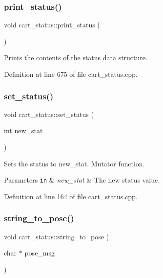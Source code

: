 \subsubsection{\texorpdfstring{print\+\_\+status()}{print\_status()}}
{\footnotesize\ttfamily void cart\+\_\+status\+::print\+\_\+status (\begin{DoxyParamCaption}{ }\end{DoxyParamCaption})}

Prints the contents of the status data structure. 

Definition at line 675 of file cart\+\_\+status.\+cpp.

\mbox{\label{classcart__status_a5db1241aff0bd874c8d108666ec8b323}} 
\subsubsection{\texorpdfstring{set\+\_\+status()}{set\_status()}}
{\footnotesize\ttfamily void cart\+\_\+status\+::set\+\_\+status (\begin{DoxyParamCaption}\item[{int}]{new\+\_\+stat }\end{DoxyParamCaption})}

Sets the status to new\+\_\+stat. Mutator function. 
\begin{DoxyParams}[1]{Parameters}
\mbox{\tt in}  & {\em new\+\_\+stat} & The new status value. \\
\hline
\end{DoxyParams}


Definition at line 164 of file cart\+\_\+status.\+cpp.

\mbox{\label{classcart__status_acacf14bfb0b1be8f32b7bf133facbfa1}} 
\subsubsection{\texorpdfstring{string\+\_\+to\+\_\+pose()}{string\_to\_pose()}}
{\footnotesize\ttfamily void cart\+\_\+status\+::string\+\_\+to\+\_\+pose (\begin{DoxyParamCaption}\item[{char $\ast$}]{pose\+\_\+msg }\end{DoxyParamCaption})}

